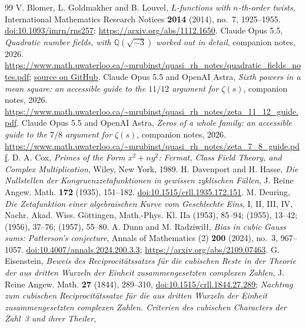 \documentclass[11pt]{article}
\numberwithin{equation}{section}
\begin{document}
\begin{thebibliography}{99}
 V. Blomer, L. Goldmakher and B. Louvel,
 \emph{$L$-functions with $n$-th-order twists},
 International Mathematics Research Notices \textbf{2014} (2014), no.~7, 1925--1955.
 \href{https://doi.org/10.1093/imrn/rns257}{doi:10.1093/imrn/rns257};
 \url{https://arxiv.org/abs/1112.1650}.
 Claude Opus 5.5, \emph{Quadratic number fields, with $\mathbb Q(\sqrt{-3})$ worked out in detail},
 companion notes, 2026.
 \url{https://www.math.uwaterloo.ca/~mrubinst/quasi_rh_notes/quadratic_fields_notes.pdf};
 \href{https://github.com/mrubinst/L-function_zero_free_strips/tree/main/quadratic_fields_notes}{source on GitHub}.
 Claude Opus 5.5 and OpenAI Astra, \emph{Sixth powers in a mean square: an accessible guide to
 the $11/12$ argument for $\zeta(s)$}, companion notes, 2026.
 \url{https://www.math.uwaterloo.ca/~mrubinst/quasi_rh_notes/zeta_11_12_guide.pdf}.
 Claude Opus 5.5 and OpenAI Astra, \emph{Zeros of a whole family: an accessible guide to the
 $7/8$ argument for $\zeta(s)$}, companion notes, 2026.
 \url{https://www.math.uwaterloo.ca/~mrubinst/quasi_rh_notes/zeta_7_8_guide.pdf}.
 D. A. Cox, \emph{Primes of the Form $x^2+ny^2$: Fermat, Class Field Theory, and Complex
 Multiplication}, Wiley, New York, 1989.
 H. Davenport and H. Hasse,
 \emph{Die Nullstellen der Kongruenzzetafunktionen in gewissen zyklischen F\"allen},
 J. Reine Angew. Math. \textbf{172} (1935), 151--182.
 \href{https://doi.org/10.1515/crll.1935.172.151}{doi:10.1515/crll.1935.172.151}.
 M. Deuring, \emph{Die Zetafunktion einer algebraischen Kurve vom Geschlechte Eins},
 I, II, III, IV, Nachr. Akad. Wiss. G\"ottingen, Math.-Phys. Kl. IIa (1953), 85--94;
 (1955), 13--42; (1956), 37--76; (1957), 55--80.
 A. Dunn and M. Radziwi\l\l,
 \emph{Bias in cubic Gauss sums: Patterson's conjecture},
 Annals of Mathematics (2) \textbf{200} (2024), no.~3, 967--1057.
 \href{https://doi.org/10.4007/annals.2024.200.3.3}{doi:10.4007/annals.2024.200.3.3};
 \url{https://arxiv.org/abs/2109.07463}.
 G. Eisenstein, \emph{Beweis des Reciprocit\"atssatzes f\"ur die cubischen Reste in der
 Theorie der aus dritten Wurzeln der Einheit zusammengesetzten complexen Zahlen},
 J. Reine Angew. Math. \textbf{27} (1844), 289--310,
 \href{https://doi.org/10.1515/crll.1844.27.289}{doi:10.1515/crll.1844.27.289};
 \emph{Nachtrag zum cubischen Reciprocit\"atssatze f\"ur die aus dritten Wurzeln der Einheit
 zusammengesetzten complexen Zahlen. Criterien des cubischen Characters der Zahl~3 und ihrer Theiler},

\end{thebibliography}
\end{document}
